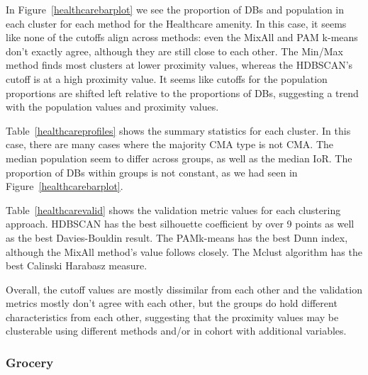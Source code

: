\documentclass[11pt, a4paper]{article}
\begin{document}
In Figure~\ref{healthcarebarplot} we see the proportion of DBs and population in each cluster for each method for the Healthcare amenity. In this case, it seems like none of the cutoffs align across methods: even the MixAll and PAM k-means don’t exactly agree, although they are still close to each other. The Min/Max method finds most clusters at lower proximity values, whereas the HDBSCAN’s cutoff is at a high proximity value. It seems like cutoffs for the population proportions are shifted left relative to the proportions of DBs, suggesting a trend with the population values and proximity values.
\par
Table~\ref{healthcareprofiles} shows the summary statistics for each cluster. In this case, there are many cases where the majority CMA type is not CMA. The median population seem to differ across groups, as well as the median IoR. The proportion of DBs within groups is not constant, as we had seen in Figure~\ref{healthcarebarplot}.
\par
Table~\ref{healthcarevalid} shows the validation metric values for each clustering approach. HDBSCAN has the best silhouette coefficient by over 9 points as well as the best Davies-Bouldin result. The PAMk-means has the best Dunn index, although the MixAll method’s value follows closely. The Mclust algorithm has the best Calinski Harabasz measure.
\par
Overall, the cutoff values are mostly dissimilar from each other and the validation metrics mostly don’t agree with each other, but the groups do hold different characteristics from each other, suggesting that the proximity values may be clusterable using different methods and/or in cohort with additional variables.




\subsubsection{Grocery}
\end{document}
